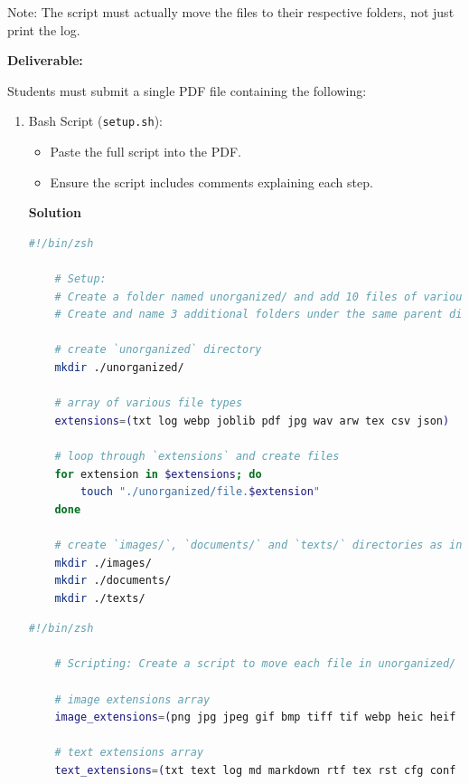 \documentclass{article}
\newcommand{\solution}{\textbf{\large Solution}}
\theoremstyle{remark}
\begin{document}
\medskip

Note: The script must actually move the files to their respective folders, not just print the log.

\medskip
\newpage

\textbf{Deliverable:}

Students must submit a single PDF file containing the following:

\begin{enumerate}
    \item Bash Script (\texttt{setup.sh}):
    \begin{itemize}
        \item Paste the full script into the PDF.
        \item Ensure the script includes comments explaining each step.
    \end{itemize}
    \solution

    \begin{lstlisting}[language=bash, caption={organize.sh}]
    #!/bin/zsh

    # Setup:
    # Create a folder named unorganized/ and add 10 files of various types: i.e., .txt, .jpg, .pdf.
    # Create and name 3 additional folders under the same parent directory: images/, documents/, and texts/.

    # create `unorganized` directory
    mkdir ./unorganized/

    # array of various file types
    extensions=(txt log webp joblib pdf jpg wav arw tex csv json)

    # loop through `extensions` and create files
    for extension in $extensions; do
        touch "./unorganized/file.$extension"
    done

    # create `images/`, `documents/` and `texts/` directories as instructed
    mkdir ./images/
    mkdir ./documents/
    mkdir ./texts/
    \end{lstlisting}

    \begin{lstlisting}[language=bash, caption={organize.sh}]
    #!/bin/zsh

    # Scripting: Create a script to move each file in unorganized/ to its respective folder.

    # image extensions array
    image_extensions=(png jpg jpeg gif bmp tiff tif webp heic heif svg ico avif)

    # text extensions array
    text_extensions=(txt text log md markdown rtf tex rst cfg conf ini yaml yml json toml)


\end{lstlisting}
\end{enumerate}
\end{document}
